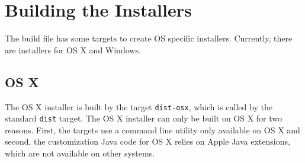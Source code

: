 \documentclass[11pt,a4paper]{article}
\begin{document}
\section{Building the Installers}

The build file has some targets to create OS specific installers. Currently,
there are installers for OS X and Windows.

\subsection{OS X}
The OS X installer is built by the target \texttt{dist-osx}, which is 
called by the standard \texttt{dist} target. The OS X installer can only
be built on OS X for two reasons. First, the targets use a command line
utility only available on OS X and second, the customization Java code
for OS X relies on Apple Java extensions, which are not available on
other systems.
\end{document}
